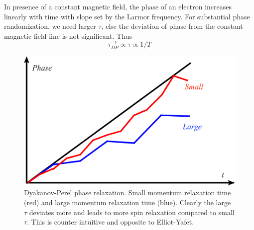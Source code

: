 \documentclass[aps,prb,onecolumn,notitlepage,showpacs,floatfix,superscriptaddress]{revtex4-1}
\begin{document}
In presence of a constant magnetic field, the phase of an electron increases linearly with time with slope set by the Larmor frequency. For substantial phase randomization, we need larger $\tau$, else the deviation of phase from the constant magnetic field line is not significant. Thus 
\begin{equation}
\tau_{DP}^{-1} \propto \tau \propto 1/T
\end{equation}
\begin{figure}
\includegraphics[scale=0.08]{DP_PhaseRelax.png} 
\caption{Dyakanov-Perel phase relaxation. Small momentum relaxation time (red) and large momentum relaxation time (blue). Clearly the large $\tau$ deviates more and leads to more spin relaxation compared to small $\tau$. This is counter intuitive and opposite to Elliot-Yafet. }
\end{figure}
\end{document}
